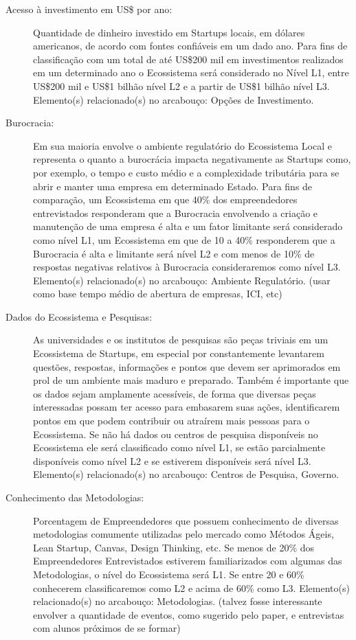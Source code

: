 \begin{description}
  \item [Acesso à investimento em US\$ por ano:] Quantidade de dinheiro investido em Startups locais, em dólares americanos, de acordo com fontes confiáveis em um dado ano. Para fins de classificação com um total de até US\$200 mil em investimentos realizados em um determinado ano o Ecossistema será considerado no Nível L1, entre US\$200 mil e US\$1 bilhão nível L2 e a partir de US\$1 bilhão nível L3. Elemento(s) relacionado(s) no arcabouço: Opções de Investimento. 

  \item [Burocracia:] Em sua maioria envolve o ambiente regulatório do Ecossistema Local e representa o quanto a burocrácia impacta negativamente as Startups como, por exemplo, o tempo e custo médio e a complexidade tributária para se abrir e manter uma empresa em determinado Estado. Para fins de comparação, um Ecossistema em que 40\% dos empreendedores entrevistados responderam que a Burocracia envolvendo a criação e manutenção de uma empresa é alta e um fator limitante será considerado como nível L1, um Ecossistema em que de 10 a 40\% responderem que a Burocracia é alta e limitante será nível L2 e com menos de 10\% de respostas negativas relativos à Burocracia consideraremos como nível L3. Elemento(s) relacionado(s) no arcabouço: Ambiente Regulatório. (usar como base tempo médio de abertura de empresas, ICI, etc)

  \item [Dados do Ecossistema e Pesquisas:] As universidades e os institutos de pesquisas são peças triviais em um Ecossistema de Startups, em especial por constantemente levantarem questões, respostas, informações e pontos que devem ser aprimorados em prol de um ambiente mais maduro e preparado. Também é importante que os dados sejam amplamente acessíveis, de forma que diversas peças interessadas possam ter acesso para embasarem suas ações, identificarem pontos em que podem contribuir ou atraírem mais pessoas para o Ecossistema. Se não há dados ou centros de pesquisa disponíveis no Ecossistema ele será classificado como nível L1, se estão parcialmente disponíveis como nível L2 e se estiverem disponíveis será nível L3. Elemento(s) relacionado(s) no arcabouço: Centros de Pesquisa, Governo.
  
  \item [Conhecimento das Metodologias:] Porcentagem de Empreendedores que possuem conhecimento de diversas metodologias comumente utilizadas pelo mercado como Métodos Ágeis, Lean Startup, Canvas, Design Thinking, etc. Se menos de 20\% dos Empreendedores Entrevistados estiverem familiarizados com algumas das Metodologias, o nível do Ecossistema será L1. Se entre 20 e 60\% conhecerem classificaremos como L2 e acima de 60\% como L3. Elemento(s) relacionado(s) no arcabouço: Metodologias. (talvez fosse interessante envolver a quantidade de eventos, como sugerido pelo paper, e entrevistas com alunos próximos de se formar)
  

\end{description}
